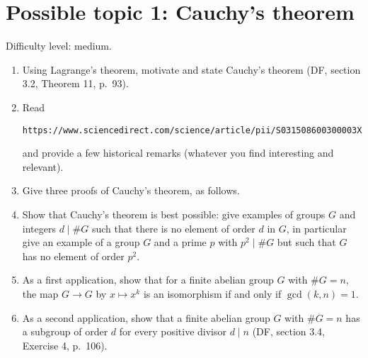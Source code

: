 \documentclass[11pt, reqno]{amsart}
\begin{document}
\section*{Possible topic 1: Cauchy's theorem}
Difficulty level: medium.
\begin{enumerate}
\item Using Lagrange's theorem, motivate and state Cauchy's theorem (DF, section 
3.2, Theorem 11, p.~93).  
\item Read
\begin{center}
\verb|https://www.sciencedirect.com/science/article/pii/S031508600300003X|
\end{center}
and provide a few historical remarks (whatever you find interesting and relevant). 
\item Give three proofs of Cauchy's theorem, as follows.
\item Show that Cauchy's theorem is best possible: give examples of groups $G$ and 
integers $d \mid \#G$ such that there is no element of order $d$ in $G$, in 
particular give an example of a group $G$ and a prime $p$ with $p^2 \mid \#G$ but 
such that $G$ has no element of order $p^2$.  
\item As a first application, show that for a finite abelian group $G$ with 
  $\#G=n$, the map $G \to G$ by $x \mapsto x^k$ is an isomorphism if and only if
  $\gcd(k,n)=1$.  
\item As a second application, show that a finite abelian group $G$ with $\#G = n$ 
has a subgroup of order $d$ for every positive divisor $d \mid n$ (DF, section 3.4,
Exercise 4, p.~106).
\end{enumerate}
\end{document}
